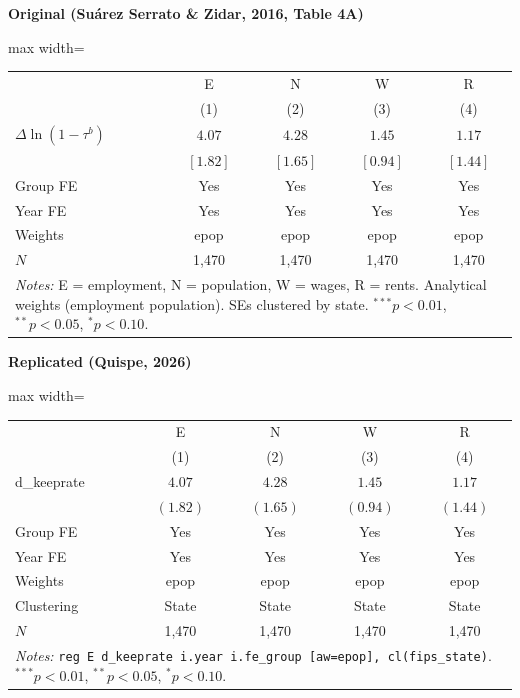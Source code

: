 \documentclass[11pt,a4paper]{article}
\begin{document}
\vspace{0.5cm}
\begin{minipage}[t]{0.48\textwidth}
\centering
\textbf{\large Original (Su\'arez Serrato \& Zidar, 2016, Table 4A)}
\vspace{0.3cm}

\begin{adjustbox}{max width=\textwidth}
\begin{tabular}{lcccc}
\toprule
 & E & N & W & R \\
 & (1) & (2) & (3) & (4) \\
\midrule
$\Delta\ln(1-\tau^b)$ & $4.07$ & $4.28$ & $1.45$ & $1.17$ \\
 & $[1.82]$ & $[1.65]$ & $[0.94]$ & $[1.44]$ \\[0.3em]
\midrule
Group FE & Yes & Yes & Yes & Yes \\
Year FE & Yes & Yes & Yes & Yes \\
Weights & epop & epop & epop & epop \\
$N$ & 1,470 & 1,470 & 1,470 & 1,470 \\
\bottomrule
\multicolumn{5}{p{0.95\textwidth}}{\footnotesize\textit{Notes:} E = employment, N = population, W = wages, R = rents. Analytical weights (employment population). SEs clustered by state. $^{***}p<0.01$, $^{**}p<0.05$, $^{*}p<0.10$.}
\end{tabular}
\end{adjustbox}
\end{minipage}%
\hfill
\begin{minipage}[t]{0.48\textwidth}
\centering
\textbf{\large Replicated (Quispe, 2026)}
\vspace{0.3cm}

\begin{adjustbox}{max width=\textwidth}
\begin{tabular}{lcccc}
\toprule
 & E & N & W & R \\
 & (1) & (2) & (3) & (4) \\
\midrule
d\_keeprate & $4.07$ & $4.28$ & $1.45$ & $1.17$ \\
 & $(1.82)$ & $(1.65)$ & $(0.94)$ & $(1.44)$ \\[0.3em]
\midrule
Group FE & Yes & Yes & Yes & Yes \\
Year FE & Yes & Yes & Yes & Yes \\
Weights & epop & epop & epop & epop \\
Clustering & State & State & State & State \\
$N$ & 1,470 & 1,470 & 1,470 & 1,470 \\
\bottomrule
\multicolumn{5}{p{0.95\textwidth}}{\footnotesize\textit{Notes:} \texttt{reg E d\_keeprate i.year i.fe\_group [aw=epop], cl(fips\_state)}. $^{***}p<0.01$, $^{**}p<0.05$, $^{*}p<0.10$.}
\end{tabular}
\end{adjustbox}
\end{minipage}
\end{document}

